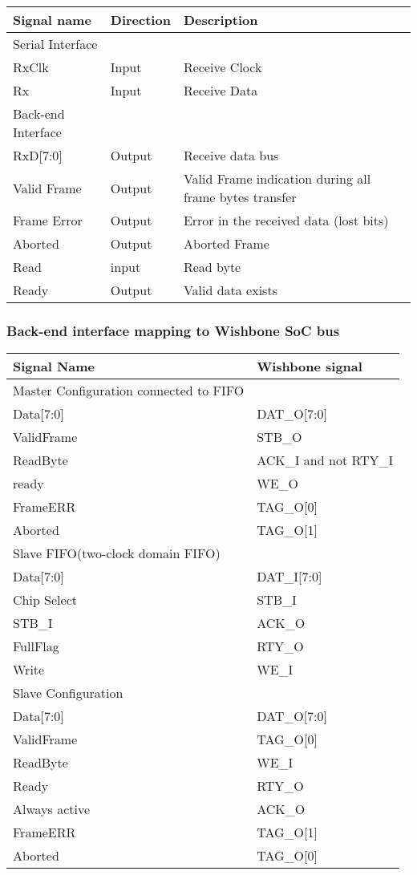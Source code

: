 \documentclass[a4paper,11pt]{article}
\begin{document}
\begin{tabular}{|l|l|l|}
\hline
Signal name& Direction& Description\\
\hline
\hline
Serial Interface & & \\
\hline
\hline
RxClk & Input & Receive Clock\\
Rx & Input& Receive Data\\
\hline
\hline
Back-end Interface & &\\
\hline
\hline
RxD[7:0]& Output& Receive data bus\\
Valid Frame& Output& Valid Frame indication during all frame bytes transfer\\
Frame Error& Output& Error in the received data (lost bits)\\
Aborted& Output& Aborted Frame\\
Read& input& Read byte\\
Ready& Output& Valid data exists\\
\hline
\end{tabular}

\subsubsection{Back-end interface mapping to Wishbone SoC bus}

\begin{tabular}{|l|l|}
\hline
Signal Name& Wishbone signal\\
\hline
\hline
Master Configuration connected to FIFO&\\
\hline
Data[7:0]& DAT\_O[7:0]\\
ValidFrame& STB\_O\\
ReadByte& ACK\_I and not RTY\_I\\
ready& WE\_O\\
FrameERR& TAG\_O[0]\\
Aborted& TAG\_O[1]\\
\hline
Slave FIFO(two-clock domain FIFO)&\\
\hline
Data[7:0]& DAT\_I[7:0]\\
Chip Select& STB\_I\\
STB\_I& ACK\_O\\
FullFlag& RTY\_O\\
Write& WE\_I\\
\hline
Slave Configuration &\\
\hline
Data[7:0]& DAT\_O[7:0]\\
ValidFrame& TAG\_O[0]\\
ReadByte& WE\_I\\
Ready& RTY\_O\\
Always active& ACK\_O\\
FrameERR& TAG\_O[1]\\
Aborted& TAG\_O[0]\\
\hline
\end{tabular}
\end{document}
